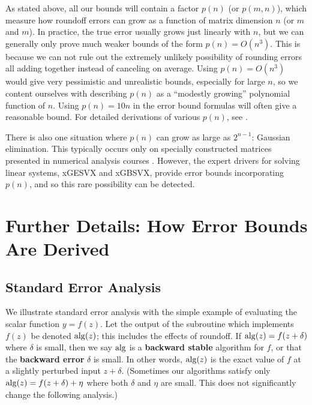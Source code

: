 As stated above, all our bounds will contain a factor
$p(n)$ (or $p(m,n)$), which measure how roundoff errors can grow
as a function of matrix dimension $n$ (or $m$ and $m$).
In practice, the true error usually grows just linearly with $n$,
but we can generally only prove much weaker bounds of the form $p(n)=O(n^3)$.
This is because we can not rule out the extremely unlikely possibility of rounding
errors all adding together instead of canceling on average. Using
$p(n) = O(n^3)$ would give very pessimistic and unrealistic bounds, especially
for large $n$, so we content ourselves with describing $p(n)$ as a
``modestly growing'' polynomial function of $n$. Using $p(n)=10n$ in
the error bound formulas will often give a reasonable bound.
For detailed derivations of various
$p(n)$, see \cite{GVL2,higham02,wilkinson1}.

There is also one situation where $p(n)$ can grow as large as $2^{n-1}$:
Gaussian elimination. This typically  occurs only on specially constructed
matrices presented in numerical analysis courses \cite[p. 212]{wilkinson1}\cite{higham02}.
However, the expert drivers for solving linear systems, xGESVX and xGBSVX,
provide error bounds incorporating $p(n)$, and so this rare possibility
can be detected.

\section{Further Details:  How Error Bounds Are Derived}\label{secwhereerrorboundscomefrom}

\subsection{Standard Error Analysis}\label{secbackwarderror}

We illustrate standard error analysis with the simple example of
evaluating the scalar function $y=f(z)$. Let the output of the
subroutine which implements $f(z)$ be denoted ${\rm alg} (z)$; this includes
the effects of roundoff. If ${\rm alg} (z) = f(z+\delta)$
where $\delta$ is small,
then we say ${\rm alg}$ is a {\bf backward stable}
algorithm for $f$,
or that the {\bf backward error} $\delta$ is small.
In other words, ${\rm alg} (z)$ is the
exact value of $f$ at a slightly perturbed input $z+\delta$.
(Sometimes our algorithms satisfy only ${\rm alg} (z)=f(z+ \delta) + \eta$ where both
$\delta$ and $\eta$ are small. This does not significantly change the following
analysis.)

